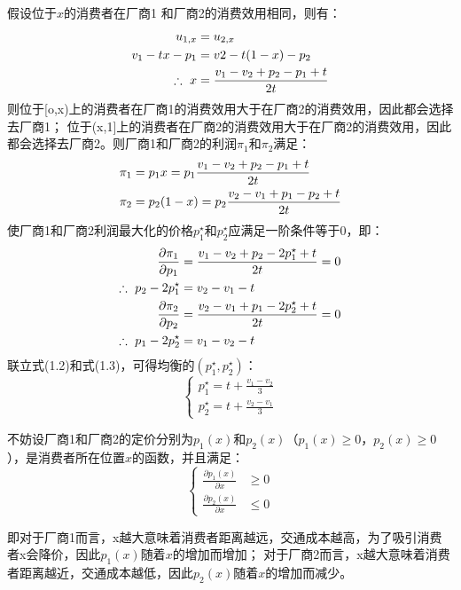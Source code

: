 \question
\qpart
假设位于$x$的消费者在厂商1 和厂商2的消费效用相同，则有：
\begin{align}
     u_{1,x}&=u_{2,x} \notag \\ 
     v_1-tx-p_1 &= v2-t(1-x)-p_2 \notag \\
     \therefore \  x &= \frac{v_1-v_2+p_2-p_1+t}{2t}
\end{align}
则位于[o,x)上的消费者在厂商1的消费效用大于在厂商2的消费效用，因此都会选择去厂商1； 位于(x,1]上的消费者在厂商2的消费效用大于在厂商2的消费效用，因此都会选择去厂商2。则厂商1和厂商2的利润$\pi_1$和$\pi_2$满足：
\begin{align}
    \pi_1 &= p_1x = p_1\frac{v_1-v_2+p_2-p_1+t}{2t}  \notag \\
    \pi_2 &= p_2(1-x) = p_2\frac{v_2-v_1+p_1-p_2+t}{2t}   \notag
\end{align}
使厂商1和厂商2利润最大化的价格$p_1^{\star}$和$p_2^{\star}$应满足一阶条件等于0，即：
\begin{align}
    \frac{\partial \pi_1 }{\partial p_1} &=\frac{v_1-v_2+p_2-2p_1^{\star}+t}{2t} = 0 \notag \\
    \therefore \ p_2-2p_1^{\star} &= v_2-v_1-t \\
    \frac{\partial \pi_2 }{\partial p_2} &=\frac{v_2-v_1+p_1-2p_2^{\star}+t}{2t} = 0 \notag \\
    \therefore \ p_1-2p_2^{\star} &= v_1-v_2-t 
\end{align}
联立式(1.2)和式(1.3)，可得均衡的$(p_1^{\star},p_2^{\star})$：
\begin{equation}
  \begin{cases}
p_1^{\star} = t+\frac{v_1-v_2}{3} \\
p_2^{\star} = t+\frac{v_2-v_1}{3}
\end{cases}  
\end{equation}

\qpart
不妨设厂商1和厂商2的定价分别为$p_1(x)$和$p_2(x)$（$p_1(x)\geq0$，$p_2(x)\geq 0$），是消费者所在位置$x$的函数，并且满足：
\begin{equation}
   \begin{cases}
    \frac{\partial p_1(x)}{\partial x}&\geq0 \\
    \frac{\partial p_2(x)}{\partial x}&\leq0
\end{cases} 
\end{equation}


即对于厂商1而言，x越大意味着消费者距离越远，交通成本越高，为了吸引消费者x会降价，因此$p_1(x)$随着$x$的增加而增加；
对于厂商2而言，x越大意味着消费者距离越近，交通成本越低，因此$p_2(x)$随着$x$的增加而减少。

